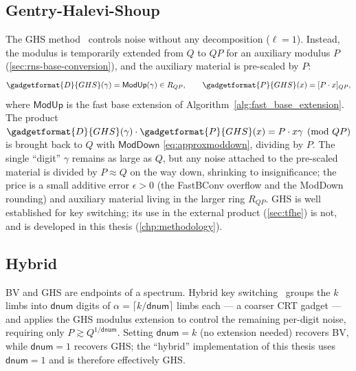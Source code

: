 \subsection{Gentry-Halevi-Shoup}
\label{sec:gadgets:ghs}
The GHS method~\cite{cryptoeprint:2012/099} controls noise without any decomposition ($\ell = 1$). Instead, the modulus is temporarily extended from $Q$ to $QP$ for an auxiliary modulus $P$ (\autoref{sec:rns-base-conversion}), and the auxiliary material is pre-scaled by $P$:
\begin{equation}
    \label{eq:ghs-gadget}
    \gadgetformat{D}{GHS}(\gamma) = \mathsf{ModUp}(\gamma) \in R_{QP}, \qquad
    \gadgetformat{P}{GHS}(x) = [P\cdot x]_{QP},
\end{equation}
where $\mathsf{ModUp}$ is the fast base extension of Algorithm~\ref{alg:fast_base_extension}. The product $\gadgetformat{D}{GHS}(\gamma)\cdot\gadgetformat{P}{GHS}(x) = P\cdot x\gamma \pmod{QP}$ is brought back to $Q$ with $\mathsf{ModDown}$ \eqref{eq:approxmoddown}, dividing by $P$. The single ``digit'' $\gamma$ remains as large as $Q$, but any noise attached to the pre-scaled material is divided by $P \approx Q$ on the way down, shrinking to insignificance; the price is a small additive error $\epsilon > 0$ (the FastBConv overflow and the ModDown rounding) and auxiliary material living in the larger ring $R_{QP}$. GHS is well established for key switching; its use in the external product (\autoref{sec:tfhe}) is not, and is developed in this thesis (\autoref{chp:methodology}).

\subsection{Hybrid}
BV and GHS are endpoints of a spectrum. Hybrid key switching~\cite{cryptoeprint:2021/204} groups the $k$ limbs into $\mathsf{dnum}$ digits of $\alpha = \lceil k/\mathsf{dnum}\rceil$ limbs each --- a coarser CRT gadget --- and applies the GHS modulus extension to control the remaining per-digit noise, requiring only $P \gtrsim Q^{1/\mathsf{dnum}}$. Setting $\mathsf{dnum} = k$ (no extension needed) recovers BV, while $\mathsf{dnum} = 1$ recovers GHS; the ``hybrid'' implementation of this thesis uses $\mathsf{dnum} = 1$ and is therefore effectively GHS.

